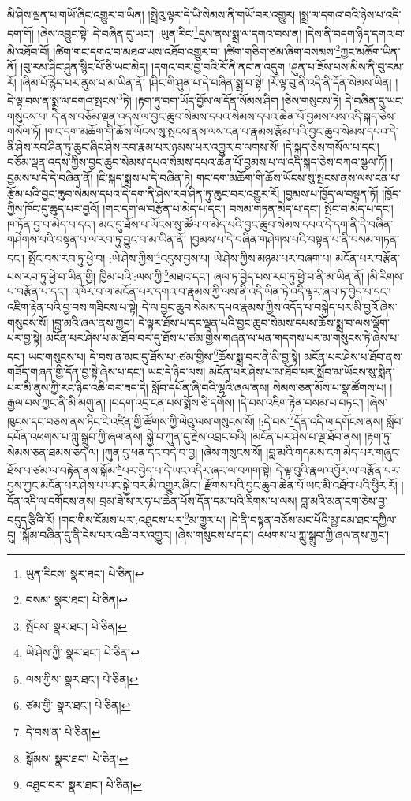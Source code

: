 མི་ཤེས་ལྡན་པ་གཡོ་ཞིང་འགྱུར་བ་ཡིན། །སྤྲེའུ་ལྟར་དེ་ཡི་སེམས་ནི་གཡོ་བར་འགྱུར། །སྨྲ་ལ་དགའ་བའི་ཉེས་པ་འདི་དག་གོ། །ཞེས་འབྱུང་སྟེ། དེ་བཞིན་དུ་ཡང་། :ཡུན་རིང་\footnote{ཡུན་རིངས་  སྣར་ཐང་།  པེ་ཅིན། }དུས་ནས་སྨྲ་ལ་དགའ་བས་ན། །དེས་ནི་བདག་ཉིད་དགའ་བ་མི་འཐོབ་བོ། །ཚིག་གང་དགའ་བ་མཐའ་ཡས་འཐོབ་འགྱུར་བ། །ཚིག་གཅིག་ཙམ་ཞིག་བསམས་\footnote{བསམ་  སྣར་ཐང་།  པེ་ཅིན། }ཀྱང་མཆོག་ཡིན་ནོ། །བུ་རམ་ཤིང་ཤུན་སྙིང་པོ་ཅི་ཡང་མེད། །དགའ་བར་བྱ་བའི་རོ་ནི་ནང་ན་འདུག །ཤུན་པ་ཟོས་པས་མིས་ནི་བུ་རམ་རོ། །ཞིམ་པོ་རྙེད་པར་ནུས་པ་མ་ཡིན་ནོ། །ཤིང་གི་ཤུན་པ་དེ་བཞིན་སྨྲ་བ་སྟེ། །རོ་ལྟ་བུ་ནི་འདི་ནི་དོན་སེམས་ཡིན། །དེ་ལྟ་བས་ན་སྨྲ་ལ་དགའ་སྤངས་\footnote{སྤོངས་  སྣར་ཐང་།  པེ་ཅིན། }ཏེ། །རྟག་ཏུ་བག་ཡོད་བྱོས་ལ་དོན་སོམས་ཤིག །ཅེས་གསུངས་ཏེ། དེ་བཞིན་དུ་ཡང་གསུངས་པ། དེ་ནས་བཅོམ་ལྡན་འདས་ལ་བྱང་ཆུབ་སེམས་དཔའ་སེམས་དཔའ་ཆེན་པོ་བྱམས་པས་འདི་སྐད་ཅེས་གསོལ་ཏོ། །གང་དག་མཆོག་གི་ཆོས་ཡོངས་སུ་སྤངས་ནས་ལས་ངན་པ་རྣམས་རྩོམ་པའི་བྱང་ཆུབ་སེམས་དཔའ་དེ་ནི་ཤེས་རབ་ཤིན་ཏུ་ཆུང་ཞིང་ཤེས་རབ་རྣམ་པར་ཉམས་པར་འགྱུར་བ་ལགས་སོ། །དེ་སྐད་ཅེས་གསོལ་པ་དང་། བཅོམ་ལྡན་འདས་ཀྱིས་བྱང་ཆུབ་སེམས་དཔའ་སེམས་དཔའ་ཆེན་པོ་བྱམས་པ་ལ་འདི་སྐད་ཅེས་བཀའ་སྩལ་ཏོ། །བྱམས་པ་དེ་དེ་བཞིན་ནོ། །ཇི་སྐད་སྨྲས་པ་དེ་བཞིན་ཏེ། གང་དག་མཆོག་གི་ཆོས་ཡོངས་སུ་སྤངས་ནས་ལས་ངན་པ་རྩོམ་པའི་བྱང་ཆུབ་སེམས་དཔའ་དེ་དག་ནི་ཤེས་རབ་ཤིན་ཏུ་ཆུང་བར་འགྱུར་རོ། །བྱམས་པ་ཁྱོད་ལ་བསྟན་ཏོ། །ཁྱོད་ཀྱིས་ཁོང་དུ་ཆུད་པར་བྱའོ། །གང་དག་ལ་བརྩོན་པ་མེད་པ་དང་། བསམ་གཏན་མེད་པ་དང་། སྤོང་བ་མེད་པ་དང་། ཁ་ཏོན་བྱ་བ་མེད་པ་དང་། མང་དུ་ཐོས་པ་ཡོངས་སུ་ཚོལ་བ་མེད་པའི་བྱང་ཆུབ་སེམས་དཔའ་དེ་དག་ནི་དེ་བཞིན་གཤེགས་པའི་བསྟན་པ་ལ་རབ་ཏུ་བྱུང་བ་མ་ཡིན་ནོ། །བྱམས་པ་དེ་བཞིན་གཤེགས་པའི་བསྟན་པ་ནི་བསམ་གཏན་དང་། སྤོང་བས་རབ་ཏུ་ཕྱེ་བ། :ཡེ་ཤེས་ཀྱིས་\footnote{ཡེ་ཤེས་ཀྱི་  སྣར་ཐང་།  པེ་ཅིན། }འདུས་བྱས་པ། ཡེ་ཤེས་ཀྱིས་མཉམ་པར་བཞག་པ། མངོན་པར་བརྩོན་པས་རབ་ཏུ་ཕྱེ་བ་ཡིན་གྱི། ཁྱིམ་པའི་:ལས་ཀྱི་\footnote{ལས་ཀྱིས་  སྣར་ཐང་།  པེ་ཅིན། }མཐའ་དང་། ཞལ་ཏ་བྱེད་པས་རབ་ཏུ་ཕྱེ་བ་ནི་མ་ཡིན་ནོ། །མི་རིགས་པ་བརྩོན་པ་དང་། འཁོར་བ་ལ་མངོན་པར་དགའ་བ་རྣམས་ཀྱི་ལས་ནི་འདི་ཡིན་ཏེ་འདི་ལྟར་ཞལ་ཏ་བྱེད་པ་དང་། འཇིག་རྟེན་པའི་བྱ་བས་གཟིངས་པ་སྟེ། དེ་ལ་བྱང་ཆུབ་སེམས་དཔའ་རྣམས་ཀྱིས་འདོད་པ་བསྐྱེད་པར་མི་བྱའོ་ཞེས་གསུངས་སོ། །བླ་མའི་ཞལ་ནས་ཀྱང་། དེ་ལྟར་ཐོས་པ་དང་ལྡན་པའི་བྱང་ཆུབ་སེམས་དཔས་ཆོས་སྨྲ་བ་ལས་ལྡོག་པར་བྱ་སྟེ། མངོན་པར་ཤེས་པ་མ་ཐོབ་བར་དུ་ཐོས་པ་ཙམ་གྱིས་གཞན་ལ་ཕན་གདགས་པར་མ་གསུངས་ཏེ་ཞེས་པ་དང་། ཡང་གསུངས་པ། དེ་བས་ན་མང་དུ་ཐོས་པ་:ཙམ་གྱིས་\footnote{ཙམ་གྱི་  སྣར་ཐང་།  པེ་ཅིན། }ཆོས་སྨྲ་བར་ནི་མི་བྱ་སྟེ། མངོན་པར་ཤེས་པ་ཐོབ་ནས་གཟོད་གཞན་གྱི་དོན་བྱ་སྟེ་ཞེས་པ་དང་། ཡང་དེ་ཉིད་ལས། མངོན་པར་ཤེས་པ་མ་ཐོབ་པར་སློབ་མ་ཡོངས་སུ་སྨིན་པར་མི་ནུས་ཀྱི་རང་ཉིད་འཆི་བར་ཟད་དེ། སློབ་དཔོན་ཞི་བའི་ལྷའི་ཞལ་ནས། སེམས་ཅན་མོས་པ་སྣ་ཚོགས་པ། །རྒྱལ་བས་ཀྱང་ནི་མི་མགུ་ན། །བདག་འདྲ་ངན་པས་སྨོས་ཅི་དགོས། །དེ་བས་འཇིག་རྟེན་བསམ་པ་བཏང་། །ཞེས་ཁུངས་དང་བཅས་ནས་ཏིང་ངེ་འཛིན་གྱི་ཚོགས་ཀྱི་ལེའུ་ལས་གསུངས་སོ། །:དེ་བས་\footnote{དེ་བས་ན་  པེ་ཅིན། }དོན་འདི་ལ་དགོངས་ནས། སློབ་དཔོན་འཕགས་པ་ཀླུ་སྒྲུབ་ཀྱི་ཞལ་ནས། སྐྱེ་བ་ཀུན་དུ་རྗེས་འབྲང་བའི། །མངོན་པར་ཤེས་པ་ལྔ་ཐོབ་ནས། །རྟག་ཏུ་སེམས་ཅན་ཐམས་ཅད་ལ། །ཀུན་དུ་ཕན་དང་བདེ་བ་བྱ། །ཞེས་གསུངས་སོ། །བླ་མའི་གདམས་ངག་མེད་པར་གཞུང་ཐོས་པ་ཙམ་ལ་བརྟེན་ནས་སྒོམ་\footnote{སྒོམས་  སྣར་ཐང་།  པེ་ཅིན། }པར་བྱེད་པ་དེ་ཡང་འདིར་ཞར་ལ་བཀག་སྟེ། དེ་ལྟ་བུའི་རྣལ་འབྱོར་ལ་བརྩོན་པར་བྱས་ཀྱང་མངོན་པར་ཤེས་པ་ཡང་སྐྱེ་བར་མི་འགྱུར་ཞིང་། རྫོགས་པའི་བྱང་ཆུབ་ཆེན་པོ་ཡང་མི་འཐོབ་པའི་ཕྱིར་རོ། །དོན་འདི་ལ་དགོངས་ནས། བྲམ་ཟེ་ས་ར་ཧ་པ་ཆེན་པོས་དོན་དམ་པའི་རིགས་པ་ལས། བླ་མའི་མན་ངག་ཅེས་བྱ་བདུད་རྩིའི་རོ། །གང་གིས་ངོམས་པར་:འཐུངས་པར་\footnote{འཐུང་བར་  སྣར་ཐང་།  པེ་ཅིན། }མ་གྱུར་པ། །དེ་ནི་བསྟན་བཅོས་མང་པོའི་མྱ་ངམ་ཐང་དཀྱིལ་དུ། །སྐོམ་བཞིན་དུ་ནི་ངེས་པར་འཆི་བར་འགྱུར། །ཞེས་གསུངས་པ་དང་། འཕགས་པ་ཀླུ་སྒྲུབ་ཀྱི་ཞལ་ནས་ཀྱང་། 